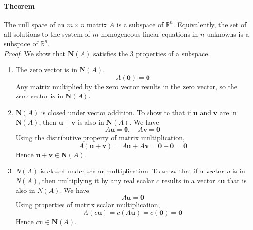 \documentclass[../linear-algebra.tex]{subfiles}
\begin{document}
\paragraph{Theorem} The null space of an $m \times n$ matrix $A$ is a subspace of $\mathbb{R}^n$.
Equivalently, the set of all solutions to the system of $m$ homogeneous linear equations in $n$ unknowns is a subspace of $\mathbb{R}^n$.\\
\textit{Proof.} We show that $\mathbf{N}(A)$ satisfies the 3 properties of a subspace.
\begin{enumerate}
    \item The zero vector is in $\mathbf{N}(A)$.
    \[A(\mathbf{0})=\mathbf{0}\]
    Any matrix multiplied by the zero vector results in the zero vector, so the zero vector is in $\mathbf{N}(A)$.
    \item $\mathbf{N}(A)$ is closed under vector addition.\newline
    To show to that if $\mathbf{u}$ and $\mathbf{v}$ are in $\mathbf{N}(A)$, then $\mathbf{u} + \mathbf{v}$ is also in $\mathbf{N}(A)$.
    We have 
    \[A\mathbf{u}=\mathbf{0},\quad A\mathbf{v}=\mathbf{0}\]
    Using the distributive property of matrix multiplication,
    \[A(\mathbf{u} + \mathbf{v}) = A\mathbf{u} + A\mathbf{v} = \mathbf{0} + \mathbf{0} = \mathbf{0}\]
    Hence $\mathbf{u} + \mathbf{v} \in \mathbf{N}(A)$.
    \item $N(A)$ is closed under scalar multiplication.\newline
    To show that if a vector $u$ is in $N(A)$, then multiplying it by any real scalar $c$ results in a vector $c\mathbf{u}$ that is also in $N(A)$.
    We have
    \[A\mathbf{u} = \mathbf{0}\]
    Using properties of matrix scalar multiplication,
    \[A(c\mathbf{u}) = c(A\mathbf{u}) = c(\mathbf{0}) = \mathbf{0}\]
    Hence $c\mathbf{u} \in \mathbf{N}(A)$.
\end{enumerate}
\end{document}
